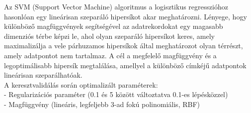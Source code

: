 \documentclass[12pt]{article}
\begin{document}
Az SVM (Support Vector Machine) algoritmus a logisztikus regresszióhoz hasonlóan egy lineárisan szeparáló hipersíkot akar meghatározni\cite{svm}. Lényege, hogy különböző magfüggvények segítségével az adatrekordokat egy magasabb dimenziós térbe képzi le, ahol olyan szeparáló hipersíkot keres, amely maximalizálja a vele párhuzamos hipersíkok által meghatározot olyan térrészt, amely adatpontot nem tartalmaz. A cél a megfelelő magfüggvény és a legoptimálisabb hipersík megtalálása, amellyel a különböző címkéjű adatpontok lineárisan szeparálhatóak. \\

\noindent A keresztvalidálás során optimalizált paraméterek: \\
- Regularizációs paraméter (0.1 és 5 között változtatva 0.1-es lépésközzel)\\
- Magfüggvény (lineáris, legfeljebb 3-ad fokú polinomiális, RBF)



%
%
%
\end{document}
